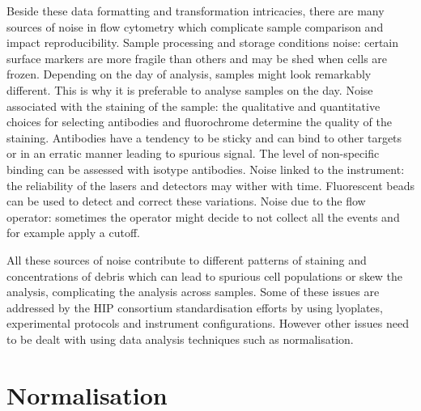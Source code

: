 Beside these data formatting and transformation intricacies, there are many sources of noise in flow cytometry which complicate sample comparison and impact reproducibility.  
Sample processing and storage conditions noise:
certain surface markers are more fragile than others and may be shed when cells are frozen.
Depending on the day of analysis, samples might look remarkably different.
This is why it is preferable to analyse samples on the day.  
Noise associated with the staining of the sample:
the qualitative and quantitative choices for selecting antibodies and fluorochrome determine the quality of the staining.
Antibodies have a tendency to be sticky and can bind to other targets or in an erratic manner leading to spurious signal.
The level of non-specific binding can be assessed with isotype antibodies.  
Noise linked to the instrument:
the reliability of the lasers and detectors may wither with time.
Fluorescent beads can be used to detect and correct these variations.  
Noise due to the flow operator:
sometimes the operator might decide to not collect all the events and for example apply a cutoff.

All these sources of noise contribute to different patterns of staining and concentrations of debris
which can lead to spurious cell populations or skew the analysis, complicating the analysis across samples.
Some of these issues are addressed by the \gls{HIP} consortium standardisation efforts \citep{Maecker:2012gl}
by using lyoplates, experimental protocols and instrument configurations.
However other issues need to be dealt with using data analysis techniques such as normalisation.

\section{Normalisation}

